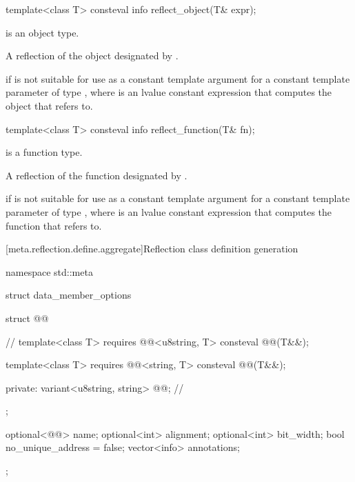 %
\begin{itemdecl}
template<class T>
  consteval info reflect_object(T& expr);
\end{itemdecl}

\begin{itemdescr}
\pnum
\mandates
{} is an object type.

\pnum
\returns
A reflection of the object designated by .

\pnum
\throws
{} if
 is not suitable for use as a constant template argument
for a constant template parameter of type ,
where  is an lvalue constant expression that
computes the object that  refers to.
\end{itemdescr}

%
\begin{itemdecl}
template<class T>
  consteval info reflect_function(T& fn);
\end{itemdecl}

\begin{itemdescr}
\pnum
\mandates
{} is a function type.

\pnum
\returns
A reflection of the function designated by .

\pnum
\throws
{} if
 is not suitable for use as a constant template argument
for a constant template parameter of type ,
where  is an lvalue constant expression that
computes the function that  refers to.
\end{itemdescr}

[meta.reflection.define.aggregate]{Reflection class definition generation}

%
\begin{codeblock}
namespace std::meta {
  struct data_member_options {
    struct @@ {                          // \expos
      template<class T>
        requires @@<u8string, T>
        consteval @@(T&&);

      template<class T>
        requires @@<string, T>
        consteval @@(T&&);

    private:
      variant<u8string, string> @@;       // \expos
    };

    optional<@@> name;
    optional<int> alignment;
    optional<int> bit_width;
    bool no_unique_address = false;
    vector<info> annotations;
  };
}
\end{codeblock}

